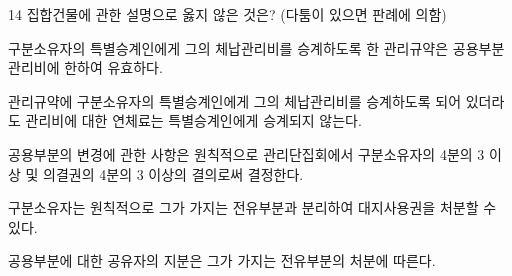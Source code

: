 \begin{question}{14}
집합건물에 관한 설명으로 옳지 않은 것은? (다툼이 있으면 판례에 의함)
\begin{choices}
  \item 구분소유자의 특별승계인에게 그의 체납관리비를 승계하도록 한 관리규약은 공용부분 관리비에 한하여 유효하다.
  \item 관리규약에 구분소유자의 특별승계인에게 그의 체납관리비를 승계하도록 되어 있더라도 관리비에 대한 연체료는 특별승계인에게 승계되지 않는다.
  \item 공용부분의 변경에 관한 사항은 원칙적으로 관리단집회에서 구분소유자의 4분의 3 이상 및 의결권의 4분의 3 이상의 결의로써 결정한다.
  \item 구분소유자는 원칙적으로 그가 가지는 전유부분과 분리하여 대지사용권을 처분할 수 있다.
  \item 공용부분에 대한 공유자의 지분은 그가 가지는 전유부분의 처분에 따른다.
\end{choices}
\end{question}
